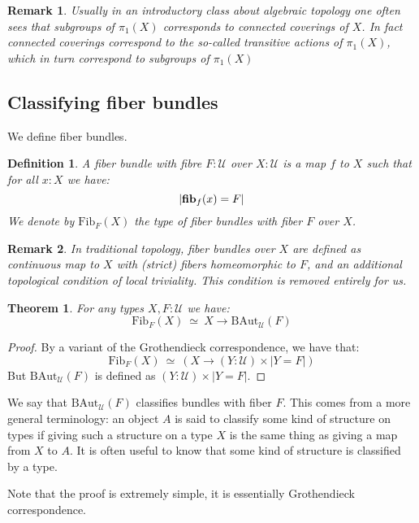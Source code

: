 \documentclass{article}
\newcommand{\sse}[1]{\medbreak \subsection{#1}}
\newcommand{\U}{{\mathcal U}}
\renewcommand{\r}{\rightarrow}
\newcommand{\fib}{\mathrm{\bf fib}}
\newcommand{\B}{\mathrm{B}}
\newcommand{\Aut}{\mathrm{Aut}}
\newcommand{\Set}{\mathrm{Set}}
\newtheorem{definition}{Definition}
\newtheorem{theorem}{Theorem}
\newtheorem{remark}{Remark}
\begin{document}

\begin{remark}
Usually in an introductory class about algebraic topology one often sees that subgroups of $\pi_1(X)$ corresponds to connected coverings of $X$. In fact connected coverings correspond to the so-called \emph{transitive} actions of $\pi_1(X)$, which in turn correspond to subgroups of $\pi_1(X)$
\end{remark}



\sse{Classifying fiber bundles}

We define fiber bundles.

\begin{definition}
A fiber bundle with fibre $F:\U$ over $X:\U$ is a map $f$ to $X$ such that for all $x:X$ we have:
\[| \fib_f(x)=F| \]
We denote by $\mathrm{Fib}_F(X)$ the type of fiber bundles with fiber $F$ over $X$.
\end{definition}

\begin{remark}
In traditional topology, fiber bundles over $X$ are defined as continuous map to $X$ with (strict) fibers homeomorphic to $F$, and an additional topological condition of \emph{local triviality}. This condition is removed entirely for us.
\end{remark}

\begin{theorem}
For any types $X,F:\U$ we have:
\[\mathrm{Fib}_F(X) \ \simeq \ X\r \B\Aut_\U(F)\]
\end{theorem}
\begin{proof}
By a variant of the Grothendieck correspondence, we have that:
\[\mathrm{Fib}_F(X) \ \simeq \ (X\r (Y:\U)\times|Y=F|)\]
But $\B\Aut_\U(F)$ is defined as $(Y:\U)\times |Y=F|$.
\end{proof}

We say that $\B \Aut_\U(F)$ classifies bundles with fiber $F$. This comes from a more general terminology: an object $A$ is said to classify some kind of structure on types if giving such a structure on a type $X$ is the same thing as giving a map from $X$ to $A$. It is often useful to know that some kind of structure is classified by a type.

Note that the proof is extremely simple, it is essentially Grothendieck correspondence.
\end{document}
